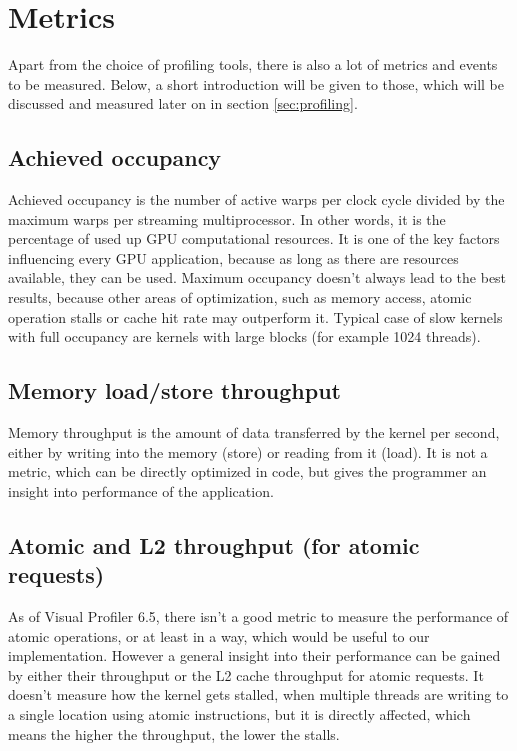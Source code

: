 \section{Metrics}\label{sec:metrics}

Apart from the choice of profiling tools, there is also a lot of metrics and events to be measured. Below, a short introduction will be given to those, which will be discussed and measured later on in section \ref{sec:profiling}.

\subsection{Achieved occupancy}\label{subsec:metrics-achieved-occupancy}

Achieved occupancy is the number of active warps per clock cycle divided by the maximum warps per streaming multiprocessor. In other words, it is the percentage of used up GPU computational resources. It is one of the key factors influencing every GPU application, because as long as there are resources available, they can be used. Maximum occupancy doesn't always lead to the best results, because other areas of optimization, such as memory access, atomic operation stalls or cache hit rate may outperform it. Typical case of slow kernels with full occupancy are kernels with large blocks (for example 1024 threads).

\subsection{Memory load/store throughput}\label{subsec:metrics-memory-throughtput}

Memory throughput is the amount of data transferred by the kernel per second, either by writing into the memory (store) or reading from it (load). It is not a metric, which can be directly optimized in code, but gives the programmer an insight into performance of the application.

\subsection{Atomic and L2 throughput (for atomic requests)}\label{subsec:metrics-atomics-throughput}

As of Visual Profiler 6.5, there isn't a good metric to measure the performance of atomic operations, or at least in a way, which would be useful to our implementation. However a general insight into their performance can be gained by either their throughput or the L2 cache throughput for atomic requests. It doesn't measure how the kernel gets stalled, when multiple threads are writing to a single location using atomic instructions, but it is directly affected, which means the higher the throughput, the lower the stalls.

